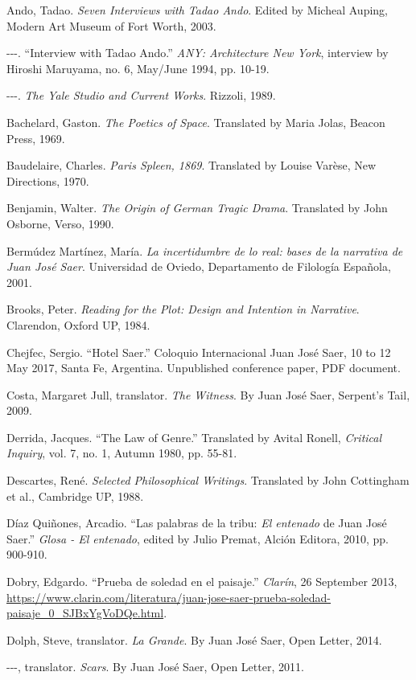 \documentclass[11pt]{report}
\begin{document}
\begin{hangparas}{.25in}{1}

Ando, Tadao. \textit{Seven Interviews with Tadao Ando}. Edited by Micheal Auping, Modern Art Museum of Fort Worth, 2003.

-{}-{}-. ``Interview with Tadao Ando.'' \textit{ANY: Architecture New York}, interview by Hiroshi Maruyama, no. 6, May/June 1994, pp. 10-19.

-{}-{}-. \textit{The Yale Studio and Current Works}. Rizzoli, 1989.

Bachelard, Gaston. \textit{The Poetics of Space}. Translated by Maria Jolas, Beacon Press, 1969.

Baudelaire, Charles. \textit{Paris Spleen, 1869}. Translated by Louise Varèse, New Directions, 1970.

Benjamin, Walter. \textit{The Origin of German Tragic Drama}. Translated by John Osborne, Verso, 1990.

Bermúdez Martínez, María. \textit{La incertidumbre de lo real: bases de la narrativa de Juan José Saer}. Universidad de Oviedo, Departamento de Filología Española, 2001.

Brooks, Peter. \textit{Reading for the Plot: Design and Intention in Narrative}. Clarendon, Oxford UP, 1984.

Chejfec, Sergio. ``Hotel Saer.'' Coloquio Internacional Juan José Saer, 10 to 12 May 2017, Santa Fe, Argentina. Unpublished conference paper, PDF document.

Costa, Margaret Jull, translator. \textit{The Witness}. By Juan José Saer, Serpent's Tail, 2009.

Derrida, Jacques. ``The Law of Genre.'' Translated by Avital Ronell, \textit{Critical Inquiry}, vol. 7, no. 1, Autumn 1980, pp. 55-81.

Descartes, René. \textit{Selected Philosophical Writings}. Translated by John Cottingham et al., Cambridge UP, 1988.

Díaz Quiñones, Arcadio. ``Las palabras de la tribu: \textit{El entenado} de Juan José Saer.'' \textit{Glosa - El entenado}, edited by Julio Premat, Alción Editora, 2010, pp. 900-910.

Dobry, Edgardo. ``Prueba de soledad en el paisaje.'' \textit{Clarín}, 26 September 2013, \url{https://www.clarin.com/literatura/juan-jose-saer-prueba-soledad-paisaje_0_SJBxYgVoDQe.html}.

Dolph, Steve, translator. \textit{La Grande}. By Juan José Saer, Open Letter, 2014.

-{}-{}-, translator. \textit{Scars}. By Juan José Saer, Open Letter, 2011.


\end{hangparas}
\end{document}
